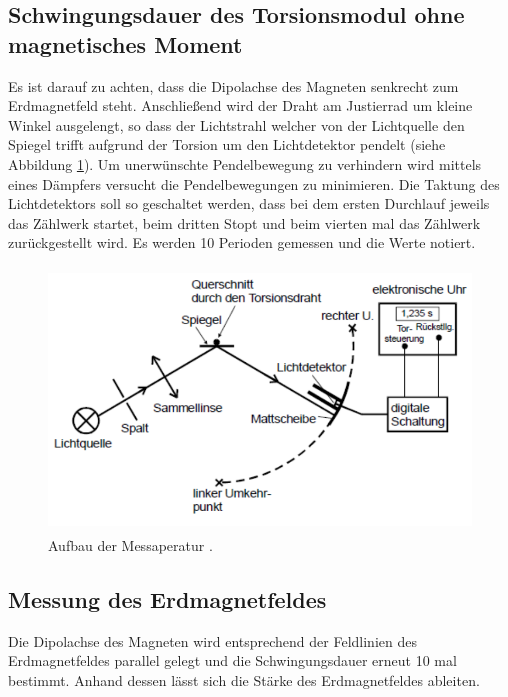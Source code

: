 \subsection{Schwingungsdauer des Torsionsmodul ohne magnetisches Moment}
Es ist darauf zu achten, dass die Dipolachse des Magneten senkrecht zum Erdmagnetfeld steht. Anschließend wird der Draht am Justierrad um kleine Winkel ausgelengt, so dass der Lichtstrahl welcher von der Lichtquelle den Spiegel trifft aufgrund der Torsion um den Lichtdetektor pendelt (siehe Abbildung \ref{fig:Aufbau}). Um unerwünschte Pendelbewegung zu verhindern wird mittels eines Dämpfers versucht die Pendelbewegungen zu minimieren. Die Taktung des Lichtdetektors soll so geschaltet werden, dass bei dem ersten Durchlauf jeweils das Zählwerk startet, beim dritten Stopt und beim vierten mal das Zählwerk zurückgestellt wird. Es werden 10 Perioden gemessen und die Werte notiert.
\begin{figure}
  \centering
  \includegraphics[height=7cm]{picture/Aufbau.png}
  \caption{Aufbau der Messaperatur \cite{sample}.}
  \label{fig:Aufbau}
\end{figure}
\subsection{Messung des Erdmagnetfeldes}
Die Dipolachse des Magneten wird entsprechend der Feldlinien des Erdmagnetfeldes parallel gelegt und die Schwingungsdauer erneut 10 mal bestimmt. Anhand dessen lässt sich die Stärke des Erdmagnetfeldes ableiten.
